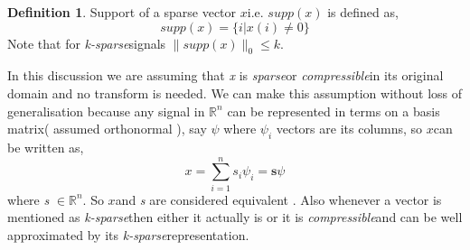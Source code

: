 \documentclass[12pt]{article}
\theoremstyle{definition}
\newtheorem{defn}{Definition}[section]
\def\compressible{\textit{compressible}\hspace{0.1in}}
\def\sparse{\textit{sparse}\hspace{0.1in}}
\def\ksparse{\textit{k-sparse}\hspace{0.1in}}
\def\x{$x$\hspace{0.1in}}
\begin{document}
\begin{defn}
 Support of a sparse vector \x i.e. $supp(x)$ is defined as,
 \begin{equation}
  supp(x)=\{i|x(i) \neq 0\}
 \end{equation}
 Note that for \ksparse signals $\|supp(x)\|_0 \leq k$.
\end{defn}

In this discussion we are assuming that \textit{x} is \sparse or \compressible in its original domain and no transform
is needed. We can make this assumption without loss of generalisation because any signal in $\mathbb{R}^n$ can be 
represented in terms on a basis matrix( assumed orthonormal ), say $\psi$ where $\psi_i$ vectors are its columns, so \x can be written as,
\begin{equation}
 x = \sum_{i=1}^{n} s_i \psi_i = \textbf{s} \psi 
\end{equation}
where \textit{s} $\in \mathbb{R}^n$. So \x and \textit{s} are considered equivalent \cite{Baraniuk-CS}. Also whenever
a vector is mentioned as \ksparse then either it actually is or it is \compressible and can be well approximated 
by its \ksparse representation.
\end{document}
